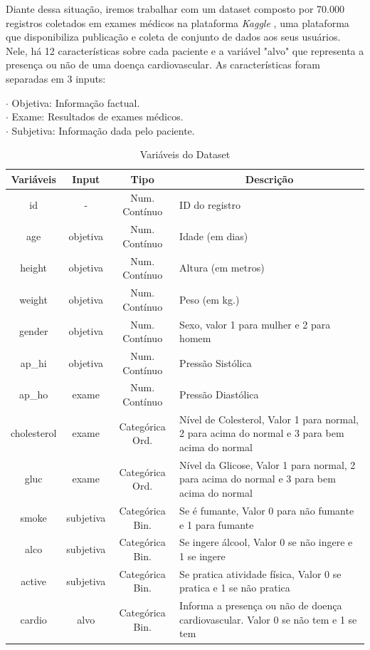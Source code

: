 \documentclass[article,11pt,a4paper,brazil]{abntex2}
\begin{document}
	Diante dessa situação, iremos trabalhar com um dataset composto por 70.000 registros coletados em exames médicos na plataforma \textit{Kaggle} \cite{datasetcardiovascular}, uma plataforma que disponibiliza publicação e coleta de conjunto de dados aos seus usuários. Nele, há 12 características sobre cada paciente e a variável "alvo" que representa a presença ou não de uma doença cardiovascular. As características foram separadas em 3 inputs:
	
	\noindent $\cdot$ Objetiva: Informação factual.\\
	$\cdot$ Exame: Resultados de exames médicos.\\
	$\cdot$ Subjetiva: Informação dada pelo paciente.
	

	\begin{table}[H]
		\caption{Variáveis do Dataset}
		\centering
		\begin{tabular}{|c|c|c|p{8cm}|}
			\hline
			Variáveis & Input & Tipo & \multicolumn{1}{c|}{Descrição}\\
			\hline
			\hline
			id &  - & Num. Contínuo & ID do registro\\
			\hline
			age & objetiva & Num. Contínuo & Idade (em dias)\\
			\hline
			height & objetiva & Num. Contínuo & Altura (em metros)\\
			\hline
			weight & objetiva & Num. Contínuo & Peso (em kg.)\\
			\hline
			gender & objetiva & Num. Contínuo & Sexo, valor 1 para mulher e 2 para homem\\
			\hline
			ap\_hi & objetiva & Num. Contínuo & Pressão Sistólica\\
			\hline
			ap\_ho & exame & Num. Contínuo & Pressão Diastólica\\
			\hline
			cholesterol & exame & Categórica Ord. & Nível de Colesterol, Valor 1 para normal,
			2 para acima do normal e 3 para bem acima do normal\\
			\hline
			gluc & exame & Categórica Ord. & Nível da Glicose, Valor 1 para normal, 2 para acima do normal e 3 para bem acima do normal\\
			\hline
			smoke & subjetiva & Categórica Bin. & Se é fumante, Valor 0 para não fumante e 1 para fumante\\
			\hline
			alco & subjetiva & Categórica Bin. & Se ingere álcool, Valor 0 se não ingere e 1 se ingere\\
			\hline
			active & subjetiva & Categórica Bin. & Se pratica atividade física, Valor 0 se pratica e 1 se não pratica\\ 
			\hline 
			cardio & alvo & Categórica Bin. & Informa a presença ou não de doença cardiovascular. Valor 0 se não tem e 1 se tem\\
			\hline
		\end{tabular}
		\label{table:variaveis}
	\end{table}
\end{document}
